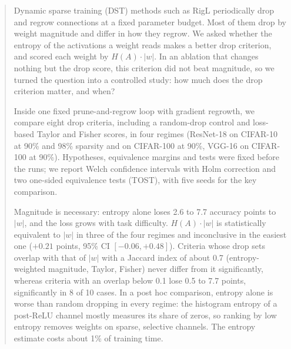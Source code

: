 \documentclass[a4paper]{cas-sc}
\begin{document}
\begin{abstract}
Dynamic sparse training (DST) methods such as RigL periodically drop and regrow connections at a fixed parameter budget. Most of them drop by weight magnitude and differ in how they regrow. We asked whether the entropy of the activations a weight reads makes a better drop criterion, and scored each weight by $H(A)\cdot|w|$. In an ablation that changes nothing but the drop score, this criterion did not beat magnitude, so we turned the question into a controlled study: how much does the drop criterion matter, and when?

Inside one fixed prune-and-regrow loop with gradient regrowth, we compare eight drop criteria, including a random-drop control and loss-based Taylor and Fisher scores, in four regimes (ResNet-18 on CIFAR-10 at 90\% and 98\% sparsity and on CIFAR-100 at 90\%, VGG-16 on CIFAR-100 at 90\%). Hypotheses, equivalence margins and tests were fixed before the runs; we report Welch confidence intervals with Holm correction and two one-sided equivalence tests (TOST), with five seeds for the key comparison.

Magnitude is necessary: entropy alone loses 2.6 to 7.7 accuracy points to $|w|$, and the loss grows with task difficulty. $H(A)\cdot|w|$ is statistically equivalent to $|w|$ in three of the four regimes and inconclusive in the easiest one ($+0.21$ points, 95\% CI $[-0.06, +0.48]$). Criteria whose drop sets overlap with that of $|w|$ with a Jaccard index of about 0.7 (entropy-weighted magnitude, Taylor, Fisher) never differ from it significantly, whereas criteria with an overlap below 0.1 lose 0.5 to 7.7 points, significantly in 8 of 10 cases. In a post hoc comparison, entropy alone is worse than random dropping in every regime: the histogram entropy of a post-ReLU channel mostly measures its share of zeros, so ranking by low entropy removes weights on sparse, selective channels. The entropy estimate costs about 1\% of training time.
\end{abstract}


\end{document}
